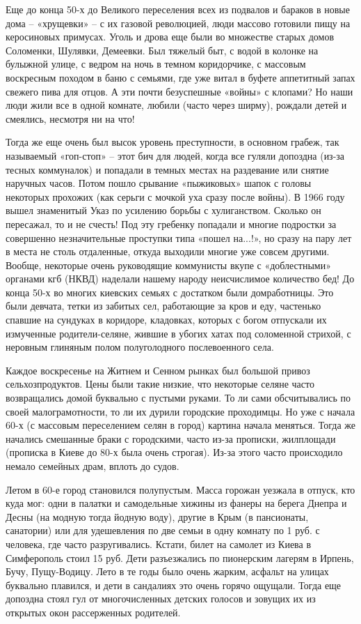 Еще до конца 50-х до Великого переселения всех из подвалов и бараков в новые
дома – «хрущевки» – с их газовой революцией, люди массово готовили пищу на
керосиновых примусах. Уголь и дрова еще были во множестве старых домов
Соломенки, Шулявки, Демеевки. Был тяжелый быт, с водой в колонке на булыжной
улице, с ведром на ночь в темном коридорчике, с массовым воскресным походом в
баню с семьями, где уже витал в буфете аппетитный запах свежего пива для отцов.
А эти почти безуспешные «войны» с клопами? Но наши люди жили все в одной
комнате, любили (часто через ширму), рождали детей и смеялись, несмотря ни на
что! 

Тогда же еще очень был высок уровень преступности, в основном грабеж, так
называемый «гоп-стоп» – этот бич для людей, когда все гуляли допоздна (из-за
тесных коммуналок) и попадали в темных местах на раздевание или снятие наручных
часов. Потом пошло срывание «пыжиковых» шапок с головы некоторых прохожих (как
серьги с мочкой уха сразу после войны). В 1966 году вышел знаменитый Указ по
усилению борьбы с хулиганством. Сколько он пересажал, то и не счесть! Под эту
гребенку попадали и многие подростки за совершенно незначительные проступки
типа «пошел на...!», но сразу на пару лет в места не столь отдаленные, откуда
выходили многие уже совсем другими. Вообще, некоторые очень руководящие
коммунисты вкупе с «доблестными» органами кгб (НКВД) наделали нашему народу
неисчислимое количество бед!  До конца 50-х во многих киевских семьях с
достатком были домработницы. Это были девчата, тетки из забитых сел, работающие
за кров и еду, частенько спавшие на сундуках в коридоре, кладовках, которых с
богом отпускали их измученные родители-селяне, жившие в убогих хатах под
соломенной стрихой, с неровным глиняным полом полуголодного послевоенного села. 

Каждое воскресенье на Житнем и Сенном рынках был большой привоз
сельхозпродуктов. Цены были такие низкие, что некоторые селяне часто
возвращались домой буквально с пустыми руками. То ли сами обсчитывались по
своей малограмотности, то ли их дурили городские проходимцы. Но уже с начала
60-х (с массовым переселением селян в город) картина начала меняться. Тогда же
начались смешанные браки с городскими, часто из-за прописки, жилплощади
(прописка в Киеве до 80-х была очень строгая). Из-за этого часто происходило
немало семейных драм, вплоть до судов. 


Летом в 60-е город становился полупустым. Масса горожан уезжала в отпуск, кто
куда мог: одни в палатки и самодельные хижины из фанеры на берега Днепра и
Десны (на модную тогда йодную воду), другие в Крым (в пансионаты, санатории)
или для удешевления по две семьи в одну комнату по 1 руб. с человека, где часто
разругивались. Кстати, билет на самолет из Киева в Симферополь стоил 15 руб.
Дети разъезжались по пионерским лагерям в Ирпень, Бучу, Пущу-Водицу. Лето в те
годы было очень жарким, асфальт на улицах буквально плавился, и дети в
сандалиях это очень горячо ощущали. Тогда еще допоздна стоял гул от
многочисленных детских голосов и зовущих их из открытых окон рассерженных
родителей. 

